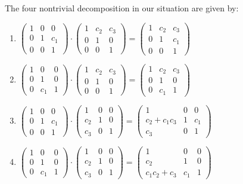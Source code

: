 \begin{rem}
  The four nontrivial decomposition in our situation are given by:
  \begin{enumerate}
  \item $\begin{pmatrix} 1 & 0 & 0 \\0 & 1 & c_1 \\0 & 0 & 1 \end{pmatrix}
    \cdot\begin{pmatrix} 1 & c_2 & c_3 \\0 & 1 & 0 \\0 & 0 & 1 \end{pmatrix}=
    \begin{pmatrix} 1 & c_2 & c_3 \\0 & 1 & c_1 \\0 & 0 & 1 \end{pmatrix}$
  \item $\begin{pmatrix} 1 & 0 & 0 \\0 & 1 & 0 \\0 & c_1 & 1 \end{pmatrix}
    \cdot\begin{pmatrix} 1 & c_2 & c_3 \\0 & 1 & 0 \\0 & 0 & 1 \end{pmatrix}=
    \begin{pmatrix} 1 & c_2 & c_3 \\0 & 1 & 0 \\0 & c_1 & 1 \end{pmatrix}$
  \item $\begin{pmatrix} 1 & 0 & 0 \\0 & 1 & c_1 \\0 & 0 & 1 \end{pmatrix}
    \cdot\begin{pmatrix} 1 & 0 & 0 \\c_2 & 1 & 0 \\c_3 & 0 & 1 \end{pmatrix}=
    \begin{pmatrix} 1 & 0 & 0 \\c_2+c_1c_3 & 1 & c_1 \\c_3 & 0 & 1 \end{pmatrix}$
  \item $\begin{pmatrix} 1 & 0 & 0 \\0 & 1 & 0 \\0 & c_1 & 1 \end{pmatrix}
    \cdot\begin{pmatrix} 1 & 0 & 0 \\c_2 & 1 & 0 \\c_3 & 0 & 1 \end{pmatrix}=
    \begin{pmatrix} 1 & 0 & 0 \\c_2 & 1 & 0 \\c_1c_2+c_3 & c_1 & 1 \end{pmatrix}$
  \end{enumerate}
\end{rem}

